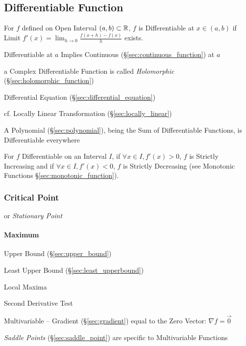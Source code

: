 \subsection{Differentiable Function}\label{sec:differentiable_function}

For $f$ defined on Open Interval $(a,b) \subset \mathbb{R}$, $f$ is
Differentiable at $x \in (a,b)$ if Limit $f'(x) = \lim_{h \rightarrow
  0} \frac{f (x+h) - f(x)}{h}$ exists.

Differentiable at $a$ Implies Continuous (\S\ref{sec:continuous_function}) at
$a$

a Complex Differentiable Function is called \emph{Holomorphic}
(\S\ref{sec:holomorphic_function})

\fist Differential Equation (\S\ref{sec:differential_equation})

\fist cf. Locally Linear Transformation (\S\ref{sec:locally_linear})

A Polynomial (\S\ref{sec:polynomial}), being the Sum of Differentiable
Functions, is Differentiable everywhere

For $f$ Differentiable on an Interval $I$, if $\forall x \in I, f'(x)
> 0$, $f$ is Strictly Increasing and if $\forall x \in I, f'(x) < 0$,
$f$ is Strictly Decreasing (see Monotonic Functions
\S\ref{sec:monotonic_function}).



\subsubsection{Critical Point}\label{sec:critical_point}

or \emph{Stationary Point}



\paragraph{Maximum}\label{sec:maximum}\hfill

Upper Bound (\S\ref{sec:upper_bound})

Least Upper Bound (\S\ref{sec:least_upperbound})

Local Maxima

Second Derivative Test

Multivariable -- Gradient (\S\ref{sec:gradient}) equal to the Zero Vector:
$\nabla{f} = \vec{0}$

\fist \emph{Saddle Points} (\S\ref{sec:saddle_point}) are specific to
Multivariable Functions



